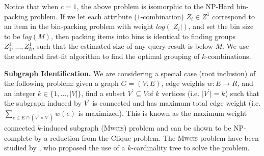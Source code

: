 Notice that when $c = 1$, the above problem is isomorphic to the NP-Hard bin-packing problem. If we let each attribute ($1$-combination) $Z_i \in Z^1$ correspond to an item in the bin-packing problem with weight $log(\lvert Z_i\rvert)$, and set the bin size to be $log(M)$, then packing items into bins is identical to finding groups $Z^1_1, \ldots, Z^1_h$, such that the estimated size of any query result is below $M$. We use the standard first-fit algorithm to find the optimal grouping of $k$-combinations.

\textbf{Subgraph Identification.} We are considering a special case (root inclusion) of the following problem: given a graph $G=(V,E)$, edge weights $w:E\rightarrow R$, and an integer $k\in\{1,\ldots,\lvert V\rvert\}$, find a subset $V^\prime \subseteq V $of $k$ vertices (i.e. $\lvert V^\prime\rvert = k$) such that the subgraph induced by $V^\prime$  is connected and has maximum total edge weight (i.e. $\sum_{e\in E\cap(V^\prime\times V^\prime)}w(e)$ is maximized). This is known as the maximum weight connected $k$-induced subgraph (\textsc{Mwcis}) problem and can be shown to be NP-complete by a reduction from the Clique problem. The \textsc{Mwcis} problem have been studied by \cite{ErnstAlthaus2009}, who proposed the use of a $k$-cardinality tree to solve the problem.


